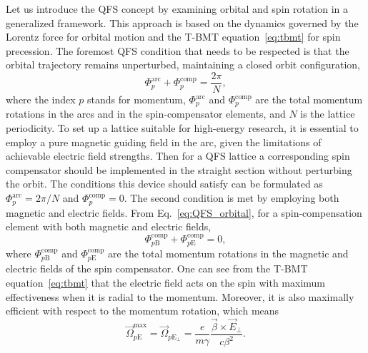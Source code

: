 Let us introduce the QFS concept by examining orbital and spin rotation in a
generalized framework. This approach is based on the dynamics governed by the
Lorentz force for orbital motion and the T-BMT equation~\eqref{eq:tbmt} for
spin precession. The foremost QFS condition that needs to be respected is that
the orbital trajectory remains unperturbed, maintaining a closed orbit
configuration,
\begin{equation}
  \Phi_p^{\mathrm{arc}}+\Phi_{p}^{\mathrm{comp}}=\frac{2\pi}{N},
  \label{eq:QFS_orbital}
\end{equation}
where the index $p$ stands for momentum, $\Phi_p^{\mathrm{arc}}$ and
$\Phi_{p}^{\mathrm{comp}}$ are the total momentum rotations in the arcs and in
the spin-compensator elements, and $N$ is the lattice periodicity. To set up a
lattice suitable for high-energy research, it is essential to employ a pure
magnetic guiding field in the arc, given the limitations of achievable electric
field strengths. Then for a QFS lattice a corresponding spin compensator should
be implemented in the straight section without perturbing the orbit. The
conditions this device should satisfy can be formulated as
$\Phi_p^{\mathrm{arc}} = 2\pi/N$ and $\Phi_{p}^{\mathrm{comp}} = 0$. The second
condition is met by employing both magnetic and electric fields. From
Eq.~\eqref{eq:QFS_orbital}, for a spin-compensation element with both magnetic
and electric fields,
\begin{equation}
  \Phi_{p\mathrm{B}}^{\mathrm{comp}}+\Phi_{p\mathrm{E}}^{\mathrm{comp}} = 0,
\end{equation}
where $\Phi_{p\mathrm{B}}^{\mathrm{comp}}$ and
$\Phi_{p\mathrm{E}}^{\mathrm{comp}}$ are the total momentum rotations in the
magnetic and electric fields of the spin compensator. One can see from the
T-BMT equation~\eqref{eq:tbmt} that the electric field acts on the spin with
maximum effectiveness when it is radial to the momentum. Moreover, it is also
maximally efficient with respect to the momentum rotation, which means
\begin{equation}
  \vec{\Omega}_{p\mathrm{E}}^{\mathrm{max}} = \vec{\Omega}_{p\mathrm{E}_{\perp}}
  =\frac{e}{m \gamma} \frac{\vec{\beta} \times \vec{E}_{\perp}}{c \beta^2}.
\end{equation}

